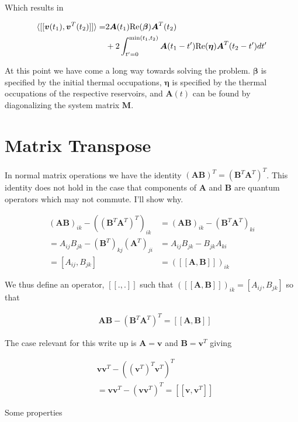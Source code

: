 \documentclass[12pt]{article}
\newcommand{\bv}[1]{\boldsymbol{#1}}
\begin{document}
Which results in

\begin{align}
\braket{[[\bv{v}(t_1),\bv{v}^T(t_2)]]} =& 2 \bv{A}(t_1) \text{Re}(\bv{\beta}) \bv{A}^T(t_2)\\
&+2 \int_{t'=0}^{\text{min}(t_1,t_2)} \bv{A}(t_1-t')\text{Re}(\bv{\eta})\bv{A}^T(t_2-t') dt'
\end{align}





At this point we have come a long way towards solving the problem. $\boldsymbol{\beta}$ is specified by the initial thermal occupations, $\boldsymbol{\eta}$ is specified by the thermal occupations of the respective reservoirs, and $\bv{A}(t)$ can be found by diagonalizing the system matrix $\bv{M}$.

\section{Matrix Transpose}

In normal matrix operations we have the identity $(\bv{A}\bv{B})^T = (\bv{B}^T\bv{A}^T)^T$. This identity does not hold in the case that components of $\bv{A}$ and $\bv{B}$ are quantum operators which may not commute. I'll show why.

\begin{align}
(\bv{A}\bv{B})_{ik} - ((\bv{B}^T\bv{A}^T)^T)_{ik} &= (\bv{A}\bv{B})_{ik} - (\bv{B}^T\bv{A}^T)_{ki}\\
= A_{ij} B_{jk} - (\bv{B}^T)_{kj}(\bv{A}^T)_{ji} &= A_{ij}B_{jk} - B_{jk} A_{ki}\\
= [A_{ij},B_{jk}] &= ([[\bv{A},\bv{B}]])_{ik} 
\end{align}

We thus define an operator, $[[.,.]]$ such that $([[\bv{A},\bv{B}]])_{ik} = [A_{ij},B_{jk}]$ so that

\begin{align}
&\bv{A}\bv{B} - (\bv{B}^T\bv{A}^T)^T = [[\bv{A},\bv{B}]]
\end{align}

The case relevant for this write up is $\bv{A} = \bv{v}$ and $\bv{B} = \bv{v}^T$ giving

\begin{align}
&\bv{v}\bv{v}^T - ((\bv{v}^T)^T\bv{v}^T)^T\\
&= \bv{v}\bv{v}^T - (\bv{v}\bv{v}^T)^T = [[\bv{v},\bv{v}^T]]
\end{align}

Some properties
\end{document}
